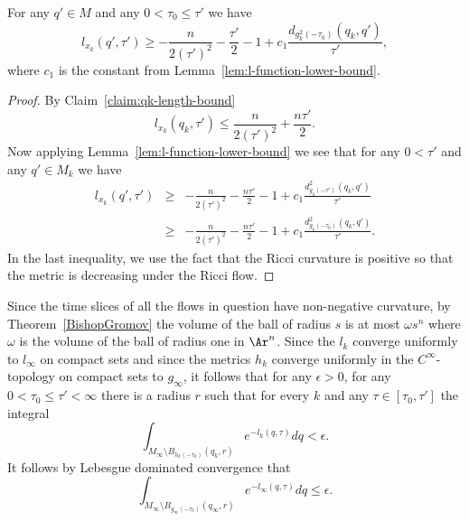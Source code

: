\begin{corollary}\label{cor:l-function-lower-bound-refined}
For  any $q'\in M$ and any $0<\tau_0\le\tau'$ we have
$$l_{x_k}(q',\tau') \ge -\frac{n}{2(\tau')^2}-\frac{\tau'}{2}-1+c_1\frac{d_{g^2_k(-\tau_0)}(q_k,q')}{\tau'},$$
where  $c_1$ is the constant from Lemma~\ref{lem:l-function-lower-bound}.
\end{corollary}

\begin{proof}
By Claim~\ref{claim:qk-length-bound}
$$l_{x_k}(q_k,\tau')\le \frac{n}{2(\tau')^2}+\frac{n\tau'}{2}.$$
Now applying Lemma~\ref{lem:l-function-lower-bound} we see that for any $0<\tau'$ and any $q'\in
M_k$ we have \begin{eqnarray*} l_{x_k}(q',\tau') & \ge &
-\frac{n}{2(\tau')^2}-\frac{n\tau'}{2}-1+c_1\frac{d^2_{g_k(-\tau')}(q_k,q')}{\tau'}
\\
& \ge &
-\frac{n}{2(\tau')^2}-\frac{n\tau'}{2}-1+c_1\frac{d^2_{g_k(-\tau_0)}(q_k,q')}{\tau'}.
\end{eqnarray*} In the last inequality, we use the fact that the
Ricci curvature is positive so that the metric is decreasing under
the Ricci flow.
\end{proof}

Since the time slices of all the flows in question have non-negative
curvature, by Theorem~\ref{BishopGromov} the volume of the ball of
radius $s$ is at most $\omega s^{n}$ where $\omega$ is the volume of
the ball of radius one in $\Ar^n$. Since the $l_k$ converge
uniformly to $l_\infty$ on compact sets and since the metrics $h_k$
converge uniformly in the $C^\infty$-topology on compact sets to
$g_\infty$, it follows that for any $\epsilon>0$, for any
$0<\tau_0\le \tau'<\infty$ there is a radius $r$ such that for every
$k$ and any $\tau\in [\tau_0,\tau']$ the integral
$$\int_{M_\infty\setminus B_{h_k(-\tau_0)}(q_k,r)}e^{-l_k(q,\tau)}dq<\epsilon.$$
It follows by Lebesgue dominated convergence that
$$\int_{M_\infty\setminus
B_{g_\infty(-\tau_0)}(q_\infty,r)}e^{-l_\infty(q,\tau)}dq\le
\epsilon.$$


